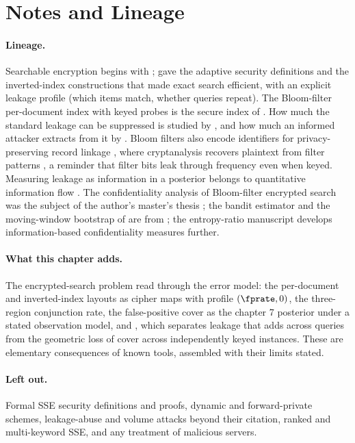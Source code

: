 %

\section{Notes and Lineage}
\label{sec:bib-notes-ch18}

\paragraph{Lineage.}
Searchable encryption begins with \textcite{song-wagner-perrig-2000};
\textcite{curtmola-et-al-2006} gave the adaptive security definitions and
the inverted-index constructions that made exact search efficient, with
an explicit leakage profile (which items match, whether queries repeat).
The Bloom-filter per-document index with keyed probes is the secure index
of \textcite{goh-2003}. How much the standard leakage can be suppressed is
studied by \textcite{kamara-moataz-ohrimenko-2018}, and how much an
informed attacker extracts from it by \textcite{cash-et-al-2015}. Bloom
filters also encode identifiers for privacy-preserving record linkage
\parencite{schnell-bachteler-reiher-2009}, where cryptanalysis recovers
plaintext from filter patterns \parencite{kuzu-et-al-2011}, a reminder
that filter bits leak through frequency even when keyed. Measuring leakage
as information in a posterior belongs to quantitative information flow
\parencite{smith-2009}. The confidentiality analysis of Bloom-filter
encrypted search was the subject of the author's master's thesis
\parencite{towell-encrypted-search-thesis}; the bandit estimator and the
moving-window bootstrap of  are from
\textcite{towell-es-conf-mab}; the entropy-ratio manuscript
\parencite{towell-maximizing-confidentiality} develops information-based
confidentiality measures further.

\paragraph{What this chapter adds.}
The encrypted-search problem read through the error model: the per-document
and inverted-index layouts as cipher maps with profile $(\fprate, 0)$, the
three-region conjunction rate, the false-positive cover as the chapter 7
posterior under a stated observation model, and
, which separates leakage that adds across
queries from the geometric loss of cover across independently keyed
instances. These are elementary consequences of known tools, assembled
with their limits stated.

\paragraph{Left out.}
Formal SSE security definitions and proofs, dynamic and forward-private
schemes, leakage-abuse and volume attacks beyond their citation, ranked
and multi-keyword SSE, and any treatment of malicious servers.
